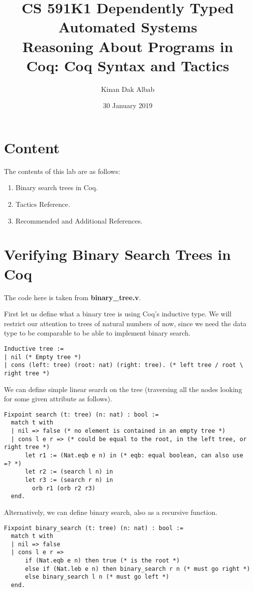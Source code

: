 \documentclass{article}
\title{CS 591K1 Dependently Typed Automated Systems\\
Reasoning About Programs in Coq: Coq Syntax and Tactics}
\author{Kinan Dak Albab}
\date{30 January 2019}
\begin{document}
\maketitle

\section {Content}
The contents of this lab are as follows:
\begin{enumerate}
    \item Binary search trees in Coq.
    \item Tactics Reference.
    \item Recommended and Additional References.
\end{enumerate}

\section{Verifying Binary Search Trees in Coq}

The code here is taken from \textbf{binary\_tree.v}.

First let us define what a binary tree is using Coq's inductive type. We will restrict our
attention to trees of natural numbers of now, since we need the data type to be comparable
to be able to implement binary search.
\begin{verbatim}
Inductive tree :=
| nil (* Empty tree *)
| cons (left: tree) (root: nat) (right: tree). (* left tree / root \ right tree *)
\end{verbatim}

We can define simple linear search on the tree (traversing all the nodes looking for
some given attribute as follows).
\begin{verbatim}
Fixpoint search (t: tree) (n: nat) : bool :=
  match t with
  | nil => false (* no element is contained in an empty tree *)
  | cons l e r => (* could be equal to the root, in the left tree, or right tree *)
      let r1 := (Nat.eqb e n) in (* eqb: equal boolean, can also use =? *)
      let r2 := (search l n) in
      let r3 := (search r n) in
        orb r1 (orb r2 r3)
  end.
\end{verbatim}

Alternatively, we can define binary search, also as a recursive function.
\begin{verbatim}
Fixpoint binary_search (t: tree) (n: nat) : bool :=
  match t with
  | nil => false
  | cons l e r =>
      if (Nat.eqb e n) then true (* is the root *)
      else if (Nat.leb e n) then binary_search r n (* must go right *)
      else binary_search l n (* must go left *)
  end.
\end{verbatim}
\end{document}
